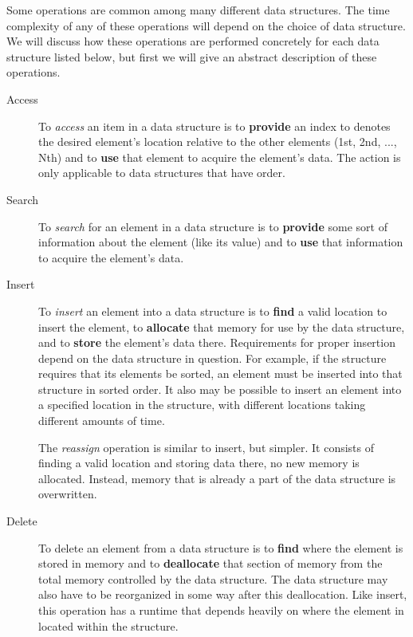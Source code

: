 Some operations are common among many different data structures. The time complexity of any of these operations will depend on the choice of data structure. We will discuss how these operations are performed concretely for each data structure listed below, but first we will give an abstract description of these operations. \\

\begin{description}
	\item[Access] To \textit{access} an item in a data structure is to \textbf{provide} an index to denotes the desired element's location relative to the other elements (1st, 2nd, ..., Nth) and to \textbf{use} that element to acquire the element's data. The action is only applicable to data structures that have order.
	\item[Search] To \textit{search} for an element in a data structure is to \textbf{provide} some sort of information about the element (like its value) and to \textbf{use} that information to acquire the element's data.
	\item[Insert] To \textit{insert} an element into a data structure is to \textbf{find} a valid location to insert the element, to \textbf{allocate} that memory for use by the data structure, and to \textbf{store} the element's data there. Requirements for proper insertion depend on the data structure in question. For example, if the structure requires that its elements be sorted, an element must be inserted into that structure in sorted order. It also may be possible to insert an element into a specified location in the structure, with different locations taking different amounts of time.
	
	The \textit{reassign} operation is similar to insert, but simpler. It consists of finding a valid location and storing data there, no new memory is allocated. Instead, memory that is already a part of the data structure is overwritten.
	\item[Delete] To delete an element from a data structure is to \textbf{find} where the element is stored in memory and to \textbf{deallocate} that section of memory from the total memory controlled by the data structure. The data structure may also have to be reorganized in some way after this deallocation. Like insert, this operation has a runtime that depends heavily on where the element in located within the structure.
\end{description}
\vspace{5mm}

